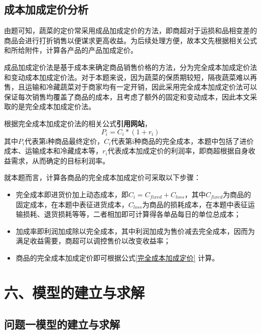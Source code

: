 \documentclass{my_paper}
\begin{document}
\subsection{成本加成定价分析}
由题可知，蔬菜的定价常采用成品加成定价的方法，即商超对于运损和品相变差的商品会进行打折销售以便谋求更高收益。为后续处理方便，故本文先根据相关公式和所给附件，计算各产品的产品加成定价。\par
成品加成定价法是基于成本来确定商品销售价格的方法，分为完全成本加成定价法和变动成本加成定价法。对于本题来说，因为蔬菜的保质期较短，隔夜蔬菜难以再售，且运输和冷藏蔬菜对于商家均有一定开销，因此采用完全成本加成定价法可以保证每次销售均覆盖了商品的成本，且考虑了额外的固定和变动成本，因此本文采取的是完全成本加成定价法。\par
根据完全成本加成定价法的相关公式\textbf{引用网站}，
\begin{equation}
    \label{完全成本加成定价}
    P_i = C_i * ( 1 + r_i )
\end{equation}
\hspace{2em}其中$P_i$代表第i种商品最终定价，$C_i$代表第i种商品的完全成本，本题中包括了进价成本、运输成本和冷藏成本等，$r_i$代表成本加成定价的利润率，即商超根据自身收益需求，从而确定的目标利润率。\par
就本题而言，计算各商品的完全成本加成定价可采取以下步骤：
\begin{itemize}
    \item 完全成本即进货价加上动态成本，即$ C_i = C_{fixed} + C_{loss} $，其中$C_{fixed}$为商品的固定成本，在本题中表征进货成本，$C_{loss}$为商品的损耗成本，在本题中表征运输损耗、退货损耗等等，二者相加即可计算得各单品每日的单位总成本；
    \item 加成率即利润加成除以完全成本，其中利润加成为售价减去完全成本，因而为满足收益需要，商超可以调控售价以改变收益率；
    \item 商品的完全成本加成定价即可根据公式\ref{完全成本加成定价} 计算。
\end{itemize}
\section{六、模型的建立与求解}


\subsection{问题一模型的建立与求解}
\end{document}
